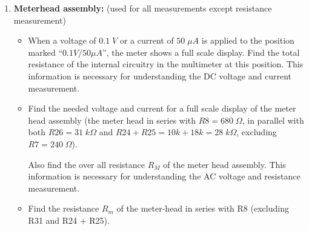 


\begin{enumerate}
\item {\bf Meterhead assembly:} (used for all measurements except resistance
  measurement)

  \begin{itemize}

  \item 
    When a voltage of $0.1\;V$ or a current of $50\;\mu A$ is applied to 
    the position marked ``$0.1V/50\mu A$'', the meter shows a full scale display.
    Find the total resistance of the internal circuitry in the multimeter at this
    position. This information is necessary for understanding the DC voltage and
    current measurement.


  \item 
    Find the needed voltage and current for a full scale display of the meter
    head assembly (the meter head in series with $R8=680\;\Omega$, in parallel 
    with both $R26=31\;k\Omega$ and $R24+R25=10k+18k=28\;k\Omega$, excluding
    $R7=240\;\Omega$). 

    Also find the over all resistance $R_M$ of the meter head assembly. This 
    information is necessary for understanding the AC voltage and resistance 
    measurement.

    \begin{comment}
    {\bf Solution:} 

    The meter-head assembly excluding $R7=240$ is $2000-240=1760\;\Omega=1.76\;k\Omega$.

    As a current $I_M=0.05\;mA$ is needed for a full scale display, the 
    corresponding voltage across the meter-head assembly is 
    $V_M=I_M R_M=1.76\times 0.05=0.088\;V$. 
    \end{comment}

  \item 
    Find the resistance $R_m$ of the meter-head in series with R8 (excluding R31 
    and R24 + R25).

    \begin{comment}
    {\bf Solution:}
    \[
    \frac{1}{28}+\frac{1}{31}+\frac{1}{R_m}=\frac{1}{1.76},
    \;\;\;\;\;\;   R_m=2\;k\Omega
    \]
    \end{comment}
  \end{itemize}


\end{enumerate}
